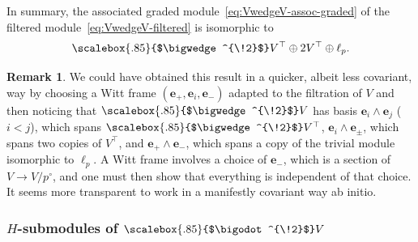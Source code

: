\documentclass[11pt,reqno,a4paper,final]{amsart}
\newcommand\ext[1]{\scalebox{.85}{$\bigwedge^{\!#1}$}}
\newcommand\sym[1]{\scalebox{.85}{$\bigodot^{\!#1}$}}
\theoremstyle{plain}
\theoremstyle{definition}
\newtheorem*{remark}{Remark}
\newcommand{\be}{\boldsymbol{e}}
\newcommand{\1}{\mathbb{1}}
\numberwithin{equation}{section}
\begin{document}
In summary, the associated graded
module~\eqref{eq:VwedgeV-assoc-graded} of the filtered
module~\eqref{eq:VwedgeV-filtered} is isomorphic to
\begin{equation}
  \ext{2}V^\top \oplus 2 V^\top \oplus \ell_p.
\end{equation}

\begin{remark}
  We could have obtained this result in a quicker, albeit less
  covariant, way by choosing a Witt frame $(\be_+,\be_i,\be_-)$
  adapted to the filtration of $V$ and then noticing that $\ext{2}V$
  has basis $\be_i \wedge \be_j$ ($i<j$), which spans $\ext{2}V^\top$,
  $\be_i \wedge \be_{\pm}$, which spans two copies of $V^\top$, and
  $\be_+ \wedge \be_-$, which spans a copy of the trivial module
  isomorphic to $\ell_p$.  A Witt frame involves a choice of $\be_-$,
  which is a section of $V \to V/p^\circ$, and one must then show that
  everything is independent of that choice.   It seems more
  transparent to work in a manifestly covariant way ab initio.
\end{remark}

\subsubsection{$H$-submodules of $\sym{2}V$}
\label{sec:submodules-sym-2-v}
\end{document}
